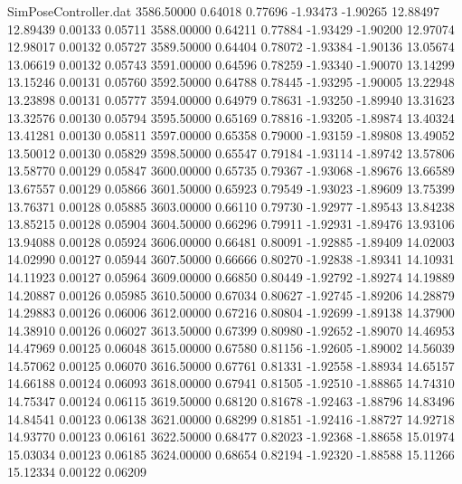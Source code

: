 \begin{filecontents}{SimPoseController.dat}
3586.50000    0.64018    0.77696    -1.93473   -1.90265   12.88497   12.89439    0.00133    0.05711
3588.00000    0.64211    0.77884    -1.93429   -1.90200   12.97074   12.98017    0.00132    0.05727
3589.50000    0.64404    0.78072    -1.93384   -1.90136   13.05674   13.06619    0.00132    0.05743
3591.00000    0.64596    0.78259    -1.93340   -1.90070   13.14299   13.15246    0.00131    0.05760
3592.50000    0.64788    0.78445    -1.93295   -1.90005   13.22948   13.23898    0.00131    0.05777
3594.00000    0.64979    0.78631    -1.93250   -1.89940   13.31623   13.32576    0.00130    0.05794
3595.50000    0.65169    0.78816    -1.93205   -1.89874   13.40324   13.41281    0.00130    0.05811
3597.00000    0.65358    0.79000    -1.93159   -1.89808   13.49052   13.50012    0.00130    0.05829
3598.50000    0.65547    0.79184    -1.93114   -1.89742   13.57806   13.58770    0.00129    0.05847
3600.00000    0.65735    0.79367    -1.93068   -1.89676   13.66589   13.67557    0.00129    0.05866
3601.50000    0.65923    0.79549    -1.93023   -1.89609   13.75399   13.76371    0.00128    0.05885
3603.00000    0.66110    0.79730    -1.92977   -1.89543   13.84238   13.85215    0.00128    0.05904
3604.50000    0.66296    0.79911    -1.92931   -1.89476   13.93106   13.94088    0.00128    0.05924
3606.00000    0.66481    0.80091    -1.92885   -1.89409   14.02003   14.02990    0.00127    0.05944
3607.50000    0.66666    0.80270    -1.92838   -1.89341   14.10931   14.11923    0.00127    0.05964
3609.00000    0.66850    0.80449    -1.92792   -1.89274   14.19889   14.20887    0.00126    0.05985
3610.50000    0.67034    0.80627    -1.92745   -1.89206   14.28879   14.29883    0.00126    0.06006
3612.00000    0.67216    0.80804    -1.92699   -1.89138   14.37900   14.38910    0.00126    0.06027
3613.50000    0.67399    0.80980    -1.92652   -1.89070   14.46953   14.47969    0.00125    0.06048
3615.00000    0.67580    0.81156    -1.92605   -1.89002   14.56039   14.57062    0.00125    0.06070
3616.50000    0.67761    0.81331    -1.92558   -1.88934   14.65157   14.66188    0.00124    0.06093
3618.00000    0.67941    0.81505    -1.92510   -1.88865   14.74310   14.75347    0.00124    0.06115
3619.50000    0.68120    0.81678    -1.92463   -1.88796   14.83496   14.84541    0.00123    0.06138
3621.00000    0.68299    0.81851    -1.92416   -1.88727   14.92718   14.93770    0.00123    0.06161
3622.50000    0.68477    0.82023    -1.92368   -1.88658   15.01974   15.03034    0.00123    0.06185
3624.00000    0.68654    0.82194    -1.92320   -1.88588   15.11266   15.12334    0.00122    0.06209

\end{filecontents}
